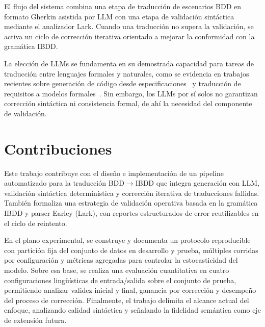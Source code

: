 El flujo del sistema combina una etapa de traducción de escenarios BDD en formato Gherkin asistida por LLM con una etapa de validación sintáctica mediante el analizador Lark. Cuando una traducción no supera la validación, se activa un ciclo de corrección iterativa orientado a mejorar la conformidad con la gramática IBDD.

La elección de LLMs se fundamenta en su demostrada capacidad para tareas de traducción entre lenguajes formales y naturales, como se evidencia en trabajos recientes sobre generación de código desde especificaciones~\cite{jiang2024codellm} y traducción de requisitos a modelos formales~\cite{soeken2012nlp}. Sin embargo, los LLMs por sí solos no garantizan corrección sintáctica ni consistencia formal, de ahí la necesidad del componente de validación.

\section{Contribuciones}

Este trabajo contribuye con el diseño e implementación de un pipeline automatizado para la traducción BDD$\rightarrow$IBDD que integra generación con LLM, validación sintáctica determinística y corrección iterativa de traducciones fallidas. También formaliza una estrategia de validación operativa basada en la gramática IBDD y parser Earley (Lark), con reportes estructurados de error reutilizables en el ciclo de reintento.

En el plano experimental, se construye y documenta un protocolo reproducible con partición fija del conjunto de datos en desarrollo y prueba, múltiples corridas por configuración y métricas agregadas para controlar la estocasticidad del modelo. Sobre esa base, se realiza una evaluación cuantitativa en cuatro configuraciones lingüísticas de entrada/salida sobre el conjunto de prueba, permitiendo analizar validez inicial y final, ganancia por corrección y desempeño del proceso de corrección. Finalmente, el trabajo delimita el alcance actual del enfoque, analizando calidad sintáctica y señalando la fidelidad semántica como eje de extensión futura.
